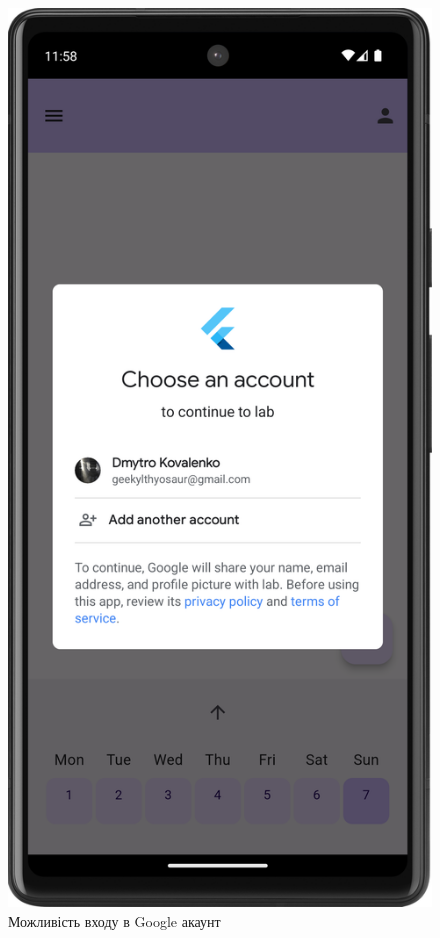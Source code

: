 \documentclass[oneside,14pt]{extarticle}
\begin{document}
\begin{normalsize}
	\begin{figure}[H]
		\begin{minipage}{0.48\textwidth}
			\centering
			\includegraphics[scale=0.12]{10}
			\caption{Можливість входу в Google акаунт}

\end{minipage}
\end{figure}
\end{normalsize}
\end{document}
